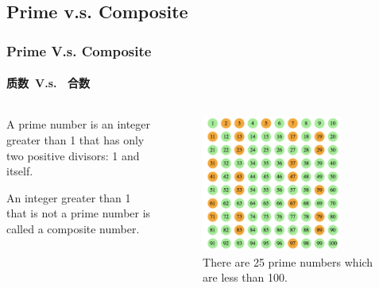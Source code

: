\documentclass[
	11pt, %
	handout,
]{beamer}
\begin{document}
\subsection{Prime v.s. Composite}
\begin{frame}
	\frametitle{Prime V.s. Composite}
	\framesubtitle{质数\  V.s. \ 合数}
	\begin{columns}[t]
	\begin{column}{0.45\textwidth}
	\begin{definition}
		  A \alert{prime number} is an integer \alert{greater than 1} that has only two positive divisors: 1 and itself.
	  \end{definition}

	  \begin{definition}
		  An integer \alert{greater than 1} that is \alert{not} a prime number is called a \alert{composite} number.
	  \end{definition}
	\end{column}
	\begin{column}{0.5\textwidth}
	  	\begin{figure}
		\includegraphics[width=0.8\textwidth]{Prime_Numbers.png}
		\caption{There are 25 prime numbers which are less than 100.}
	\end{figure}
	\end{column}
	\end{columns}


\end{frame}

\end{document}
